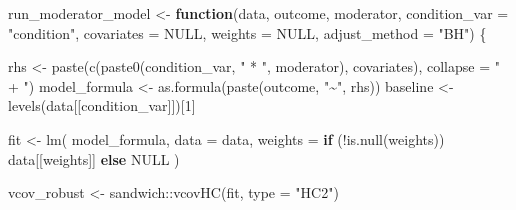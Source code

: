\documentclass[
  letterpaper,
  DIV=11,
  numbers=noendperiod]{scrartcl}
\newenvironment{Shaded}{\begin{snugshade}}{\end{snugshade}}
\newcommand{\AttributeTok}[1]{\textcolor[rgb]{0.40,0.45,0.13}{#1}}
\newcommand{\ConstantTok}[1]{\textcolor[rgb]{0.56,0.35,0.01}{#1}}
\newcommand{\ControlFlowTok}[1]{\textcolor[rgb]{0.00,0.23,0.31}{\textbf{#1}}}
\newcommand{\DecValTok}[1]{\textcolor[rgb]{0.68,0.00,0.00}{#1}}
\newcommand{\FunctionTok}[1]{\textcolor[rgb]{0.28,0.35,0.67}{#1}}
\newcommand{\NormalTok}[1]{\textcolor[rgb]{0.00,0.23,0.31}{#1}}
\newcommand{\OtherTok}[1]{\textcolor[rgb]{0.00,0.23,0.31}{#1}}
\newcommand{\SpecialCharTok}[1]{\textcolor[rgb]{0.37,0.37,0.37}{#1}}
\newcommand{\StringTok}[1]{\textcolor[rgb]{0.13,0.47,0.30}{#1}}
\begin{document}
\begin{Shaded}
\begin{Highlighting}[]
\NormalTok{run\_moderator\_model }\OtherTok{\textless{}{-}} \ControlFlowTok{function}\NormalTok{(data,}
\NormalTok{                                outcome,}
\NormalTok{                                moderator,}
                                \AttributeTok{condition\_var =} \StringTok{"condition"}\NormalTok{,}
                                \AttributeTok{covariates    =} \ConstantTok{NULL}\NormalTok{,}
                                \AttributeTok{weights       =} \ConstantTok{NULL}\NormalTok{,}
                                \AttributeTok{adjust\_method =} \StringTok{"BH"}\NormalTok{) \{}
  
\NormalTok{  rhs           }\OtherTok{\textless{}{-}} \FunctionTok{paste}\NormalTok{(}\FunctionTok{c}\NormalTok{(}\FunctionTok{paste0}\NormalTok{(condition\_var, }\StringTok{" * "}\NormalTok{, moderator), covariates),}
                         \AttributeTok{collapse =} \StringTok{" + "}\NormalTok{)}
\NormalTok{  model\_formula }\OtherTok{\textless{}{-}} \FunctionTok{as.formula}\NormalTok{(}\FunctionTok{paste}\NormalTok{(outcome, }\StringTok{"\textasciitilde{}"}\NormalTok{, rhs))}
\NormalTok{  baseline      }\OtherTok{\textless{}{-}} \FunctionTok{levels}\NormalTok{(data[[condition\_var]])[}\DecValTok{1}\NormalTok{]}
  
\NormalTok{  fit }\OtherTok{\textless{}{-}} \FunctionTok{lm}\NormalTok{(}
\NormalTok{    model\_formula,}
    \AttributeTok{data    =}\NormalTok{ data,}
    \AttributeTok{weights =} \ControlFlowTok{if}\NormalTok{ (}\SpecialCharTok{!}\FunctionTok{is.null}\NormalTok{(weights)) data[[weights]] }\ControlFlowTok{else} \ConstantTok{NULL}
\NormalTok{  )}
  
\NormalTok{  vcov\_robust }\OtherTok{\textless{}{-}}\NormalTok{ sandwich}\SpecialCharTok{::}\FunctionTok{vcovHC}\NormalTok{(fit, }\AttributeTok{type =} \StringTok{"HC2"}\NormalTok{)}
  

\end{Highlighting}
\end{Shaded}
\end{document}

